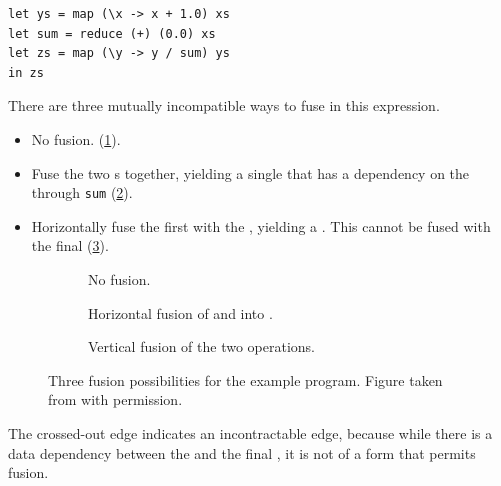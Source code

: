 \begin{lstlisting}
let ys = map (\x -> x + 1.0) xs
let sum = reduce (+) (0.0) xs
let zs = map (\y -> y / sum) ys
in zs
\end{lstlisting}

There are three mutually incompatible ways to fuse in this expression.

\begin{itemize}
\item No fusion. (\cref{fig:three-fusion-no-fusion}).
\item Fuse the two s together, yielding a single  that
  has a dependency on the  through \texttt{sum}
  (\cref{fig:three-fusion-map-map}).
\item Horizontally fuse the first  with the ,
  yielding a .  This  cannot be fused with the
  final  (\cref{fig:three-fusion-map-reduce}).
\end{itemize}

\begin{figure}
  \centering

  \begin{subfigure}[t]{0.32\textwidth}
      
      \caption{No fusion.}
      \label{fig:three-fusion-no-fusion}
  \end{subfigure}
  \begin{subfigure}[t]{0.32\textwidth}
    
    \caption{Horizontal fusion of  and  into .}
      \label{fig:three-fusion-map-map}
  \end{subfigure}
  \begin{subfigure}[t]{0.32\textwidth}
    
    \caption{Vertical fusion of the two  operations.}
      \label{fig:three-fusion-map-reduce}
  \end{subfigure}


  \caption{Three fusion possibilities for the example program. Figure
    taken from \cite{dybdal2017array} with permission.}
  \label{fig:three-fusion-opportunities}
\end{figure}

The crossed-out edge indicates an incontractable edge, because while
there is a data dependency between the  and the final
, it is not of a form that permits fusion.

